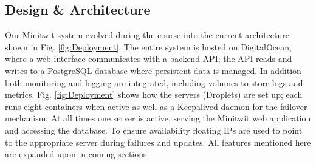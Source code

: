 
\subsection{Design \& Architecture}

Our Minitwit system evolved during the course into the current architecture shown in Fig. \ref{fig:Deployment}. The entire system is hosted on DigitalOcean, where a web interface communicates with a backend API; the API reads and writes to a PostgreSQL database where persistent data is managed. In addition both monitoring and logging are integrated, including volumes to store logs and metrics. Fig. \ref{fig:Deployment} shows how the servers (Droplets) are set up; each runs eight containers when active as well as a Keepalived daemon for the failover mechanism. At all times one server is active, serving the Minitwit web application and accessing the database. To ensure availability floating IPs are used to point to the appropriate server during failures and updates. All features mentioned here are expanded upon in coming sections.

